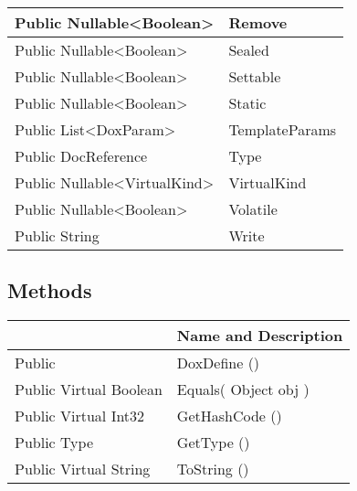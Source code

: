\documentclass[11pt, oneside, a4paper]{book}
\begin{document}
\begin{center}
\begin{tabular}{| p{3cm} | p{12cm} | }
\hline
 Public  Nullable<Boolean> &  Remove\hypertarget{SoftwareEngineeringTools.{}Documentation.{}DoxDefine.{}Remove}{}\\
\hline
 Public  Nullable<Boolean> &  Sealed\hypertarget{SoftwareEngineeringTools.{}Documentation.{}DoxDefine.{}Sealed}{}\\
\hline
 Public  Nullable<Boolean> &  Settable\hypertarget{SoftwareEngineeringTools.{}Documentation.{}DoxDefine.{}Settable}{}\\
\hline
 Public  Nullable<Boolean> &  Static\hypertarget{SoftwareEngineeringTools.{}Documentation.{}DoxDefine.{}Static}{}\\
\hline
 Public  List<DoxParam> &  TemplateParams\hypertarget{SoftwareEngineeringTools.{}Documentation.{}DoxDefine.{}TemplateParams}{}\\
\hline
 Public  DocReference &  Type\hypertarget{SoftwareEngineeringTools.{}Documentation.{}DoxDefine.{}Type}{}\\
\hline
 Public  Nullable<VirtualKind> &  VirtualKind\hypertarget{SoftwareEngineeringTools.{}Documentation.{}DoxDefine.{}VirtualKind}{}\\
\hline
 Public  Nullable<Boolean> &  Volatile\hypertarget{SoftwareEngineeringTools.{}Documentation.{}DoxDefine.{}Volatile}{}\\
\hline
 Public  String &  Write\hypertarget{SoftwareEngineeringTools.{}Documentation.{}DoxDefine.{}Write}{}\\
\hline
\end{tabular}
\end{center}

\subsection{Methods}
\begin{center}
\begin{tabular}{| p{3cm} | p{12cm} | }
\hline
\textbf{ } & \textbf{ Name and Description}\\
\hline
 Public  &  DoxDefine ()\hypertarget{SoftwareEngineeringTools.{}Documentation.{}DoxDefine.{}DoxDefine}{}\\
\hline
 Public  Virtual  Boolean &  Equals(\hypertarget{SoftwareEngineeringTools.{}Documentation.{}DoxDefine.{}Equals\_Object}{} Object  obj  )\\
\hline
 Public  Virtual  Int32 &  GetHashCode ()\hypertarget{SoftwareEngineeringTools.{}Documentation.{}DoxDefine.{}GetHashCode}{}\\
\hline
 Public  Type &  GetType ()\hypertarget{SoftwareEngineeringTools.{}Documentation.{}DoxDefine.{}GetType}{}\\
\hline
 Public  Virtual  String &  ToString ()\hypertarget{SoftwareEngineeringTools.{}Documentation.{}DoxDefine.{}ToString}{}\\
\hline
\end{tabular}
\end{center}
 
\end{document}
